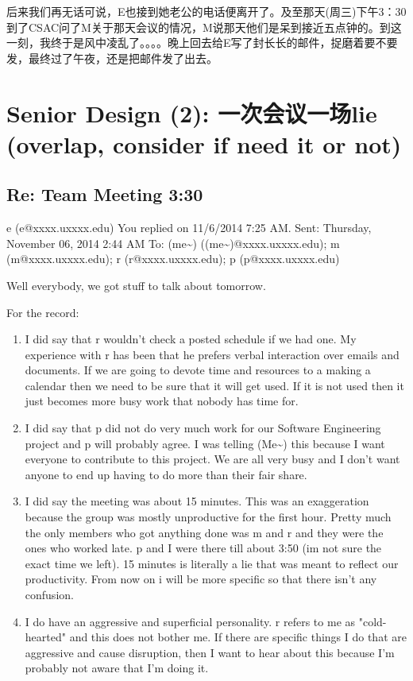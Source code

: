 \documentclass[12pt]{book}
\begin{document}
后来我们再无话可说，E也接到她老公的电话便离开了。及至那天(周三)下午3：30 到了CSAC问了M关于那天会议的情况，M说那天他们是呆到接近五点钟的。到这一刻，我终于是风中凌乱了。。。。晚上回去给E写了封长长的邮件，捉磨着要不要发，最终过了午夜，还是把邮件发了出去。

\chapter{Senior Design (2): 一次会议一场lie (overlap, consider if need it or not)}
\label{sec-22}
\section{Re: Team Meeting 3:30}
\label{sec-22-1}
e (e@xxxx.uxxxx.edu)
You replied on 11/6/2014 7:25 AM.
Sent:        Thursday, November 06, 2014 2:44 AM
To:        
(me\textasciitilde{}) ((me\textasciitilde{})@xxxx.uxxxx.edu); m (m@xxxx.uxxxx.edu); r (r@xxxx.uxxxx.edu); p (p@xxxx.uxxxx.edu)

Well everybody, we got stuff to talk about tomorrow. 

For the record:

\begin{enumerate}
\item I did say that r wouldn't check a posted schedule if we had one. My experience with r has been that he prefers verbal interaction over emails and documents. If we are going to devote time and resources to a making a calendar then we need to be sure that it will get used. If it is not used then it just becomes more busy work that nobody has time for.
\item I did say that p did not do very much work for our Software Engineering project and p will probably agree. I was telling (Me\textasciitilde{}) this because I want everyone to contribute to this project. We are all very busy and I don't want anyone to end up having to do more than their fair share.
\item I did say the meeting was about 15 minutes. This was an exaggeration because the group was mostly unproductive for the first hour. Pretty much the only members who got anything done was m and r and they were the ones who worked late. p and I were there till about 3:50 (im not sure the exact time we left). 15 minutes is literally a lie that was meant to reflect our productivity. From now on i will be more specific so that there isn't any confusion.
\item I do have an aggressive and superficial personality. r refers to me as "cold-hearted" and this does not bother me. If there are specific things I do that are aggressive and cause disruption, then I want to hear about this because I'm probably not aware that I'm doing it.
\end{enumerate}
\end{document}

